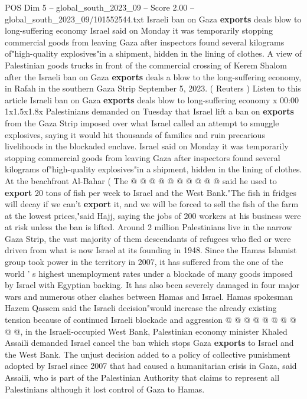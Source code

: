 \begin{textsample}{POS Dim 5 – global\_south\_2023\_09 – Score 2.00 – global\_south\_2023\_09/101552544.txt}  \label{ex:f5_pos_447}
Israeli ban on Gaza \textbf{exports} deals blow to long-suffering economy Israel said on Monday it was temporarily stopping commercial goods from leaving Gaza after inspectors found several kilograms of"high-quality explosives"in a shipment, hidden in the lining of clothes.
A view of Palestinian goods trucks in front of the commercial crossing of Kerem Shalom after the Israeli ban on Gaza \textbf{exports} deals a blow to the long-suffering economy, in Rafah in the southern Gaza Strip September 5, 2023. ( Reuters ) Listen to this article Israeli ban on Gaza \textbf{exports} deals blow to long-suffering economy x 00:00 1x1.5x1.8x Palestinians demanded on Tuesday that Israel lift a ban on \textbf{exports} from the Gaza Strip imposed over what Israel called an attempt to smuggle explosives, saying it would hit thousands of families and ruin precarious livelihoods in the blockaded enclave.
Israel said on Monday it was temporarily stopping commercial goods from leaving Gaza after inspectors found several kilograms of"high-quality explosives"in a shipment, hidden in the lining of clothes.
At the beachfront Al-Bahar ( The @ @ @ @ @ @ @ @ @ @ said he used to \textbf{export} 20 tons of fish per week to Israel and the West Bank."The fish in fridges will decay if we can't \textbf{export} it, and we will be forced to sell the fish of the farm at the lowest prices,"said Hajj, saying the jobs of 200 workers at his business were at risk unless the ban is lifted.
Around 2 million Palestinians live in the narrow Gaza Strip, the vast majority of them descendants of refugees who fled or were driven from what is now Israel at its founding in 1948.
Since the Hamas Islamist group took power in the territory in 2007, it has suffered from the one of the world ' s highest unemployment rates under a blockade of many goods imposed by Israel with Egyptian backing.
It has also been severely damaged in four major wars and numerous other clashes between Hamas and Israel.
Hamas spokesman Hazem Qassem said the Israeli decision"would increase the already existing tension because of continued Israeli blockade and aggression @ @ @ @ @ @ @ @ @ @, in the Israeli-occupied West Bank, Palestinian economy minister Khaled Assaili demanded Israel cancel the ban which stops Gaza \textbf{exports} to Israel and the West Bank.
The unjust decision added to a policy of collective punishment adopted by Israel since 2007 that had caused a humanitarian crisis in Gaza, said Assaili, who is part of the Palestinian Authority that claims to represent all Palestinians although it lost control of Gaza to Hamas.

\end{textsample}
